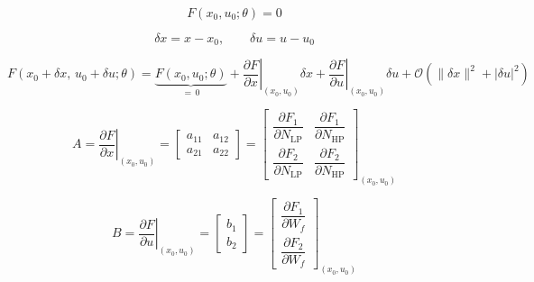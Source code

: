 \documentclass[11pt,a4paper]{article}
\begin{document}
\begin{equation}
  F(x_0,u_0;\theta) = 0
  \label{eq:equilibrium}
\end{equation}

\begin{equation}
  \delta x = x - x_0, \qquad \delta u = u - u_0
  \label{eq:deviations}
\end{equation}

\begin{equation}
  F(x_0+\delta x,\,u_0+\delta u;\theta)
  = \underbrace{F(x_0,u_0;\theta)}_{=\,0}
  + \left.\frac{\partial F}{\partial x}\right|_{(x_0,u_0)} \delta x
  + \left.\frac{\partial F}{\partial u}\right|_{(x_0,u_0)} \delta u
  + \mathcal{O}\!\left(\|\delta x\|^{2} + |\delta u|^{2}\right)
  \label{eq:taylor}
\end{equation}

\begin{equation}
  A = \left.\frac{\partial F}{\partial x}\right|_{(x_0,u_0)}
  = \begin{bmatrix} a_{11} & a_{12} \\ a_{21} & a_{22} \end{bmatrix}
  = \begin{bmatrix}
      \dfrac{\partial F_1}{\partial N_{\mathrm{LP}}} & \dfrac{\partial F_1}{\partial N_{\mathrm{HP}}} \\[10pt]
      \dfrac{\partial F_2}{\partial N_{\mathrm{LP}}} & \dfrac{\partial F_2}{\partial N_{\mathrm{HP}}}
    \end{bmatrix}_{(x_0,u_0)}
  \label{eq:jacobian-a}
\end{equation}

\begin{equation}
  B = \left.\frac{\partial F}{\partial u}\right|_{(x_0,u_0)}
  = \begin{bmatrix} b_{1} \\ b_{2} \end{bmatrix}
  = \begin{bmatrix}
      \dfrac{\partial F_1}{\partial W_f} \\[10pt]
      \dfrac{\partial F_2}{\partial W_f}
    \end{bmatrix}_{(x_0,u_0)}
  \label{eq:jacobian-b}
\end{equation}
\end{document}
